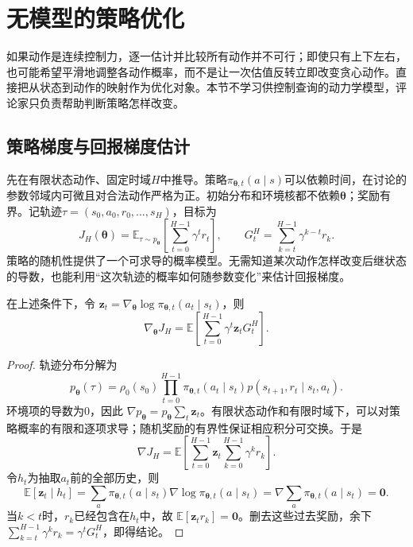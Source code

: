 \section{无模型的策略优化}
\label{sec:rl-learning-policy}

如果动作是连续控制力，逐一估计并比较所有动作并不可行；即使只有上下左右，也可能希望平滑地调整各动作概率，而不是让一次估值反转立即改变贪心动作。直接把从状态到动作的映射作为优化对象。本节不学习供控制查询的动力学模型，评论家只负责帮助判断策略怎样改变。

\subsection{策略梯度与回报梯度估计}
\label{sec:rl-learning-policy-gradient}

先在有限状态动作、固定时域$H$中推导。策略$\pi_{\bm\theta,t}(a\mid s)$可以依赖时间，在讨论的参数邻域内可微且对合法动作严格为正。初始分布和环境核都不依赖$\bm\theta$；奖励有界。记轨迹$\tau=(s_0,a_0,r_0,\ldots,s_H)$，目标为
\begin{equation}
  J_H(\bm\theta)=\mathbb E_{\tau\sim p_{\bm\theta}}
      \left[\sum_{t=0}^{H-1}\gamma^t r_t\right],
  \qquad
  G_t^{H}=\sum_{k=t}^{H-1}\gamma^{k-t}r_k .
  \label{eq:rl-learning-finite-policy-objective}
\end{equation}
策略的随机性提供了一个可求导的概率模型。无需知道某次动作怎样改变后继状态的导数，也能利用“这次轨迹的概率如何随参数变化”来估计回报梯度。

\begin{theorem}[有限时域似然比策略梯度]
  \label{thm:rl-learning-likelihood-gradient}
  在上述条件下，令
  $\bm{z}_t=\nabla_{\bm\theta}\log\pi_{\bm\theta,t}(a_t\mid s_t)$，则
  \begin{equation}
    \nabla_{\bm\theta}J_H
       =\mathbb E\left[
          \sum_{t=0}^{H-1}\gamma^t\bm{z}_tG_t^H\right].
    \label{eq:rl-learning-reward-to-go}
  \end{equation}
\end{theorem}
\begin{proof}
  轨迹分布分解为
  \[
    p_{\bm\theta}(\tau)=\rho_0(s_0)
       \prod_{t=0}^{H-1}
       \pi_{\bm\theta,t}(a_t\mid s_t)
       p(s_{t+1},r_t\mid s_t,a_t).
  \]
  环境项的导数为0，因此
  $\nabla p_{\bm\theta}=p_{\bm\theta}\sum_t\bm{z}_t$。有限状态动作和有限时域下，可以对策略概率的有限和逐项求导；随机奖励的有界性保证相应积分可交换。于是
  \[
    \nabla J_H
      =\mathbb E\left[
        \sum_{t=0}^{H-1}\bm{z}_t
        \sum_{k=0}^{H-1}\gamma^k r_k\right].
  \]
  令$h_t$为抽取$a_t$前的全部历史，则
  \[
    \mathbb E[\bm{z}_t\mid h_t]
       =\sum_a\pi_{\bm\theta,t}(a\mid s_t)
          \nabla\log\pi_{\bm\theta,t}(a\mid s_t)
       =\nabla\sum_a\pi_{\bm\theta,t}(a\mid s_t)=\bm0.
  \]
  当$k<t$时，$r_k$已经包含在$h_t$中，故
  $\mathbb E[\bm{z}_t r_k]=\bm0$。删去这些过去奖励，余下
  $\sum_{k=t}^{H-1}\gamma^k r_k=\gamma^tG_t^H$，即得结论。
\end{proof}

